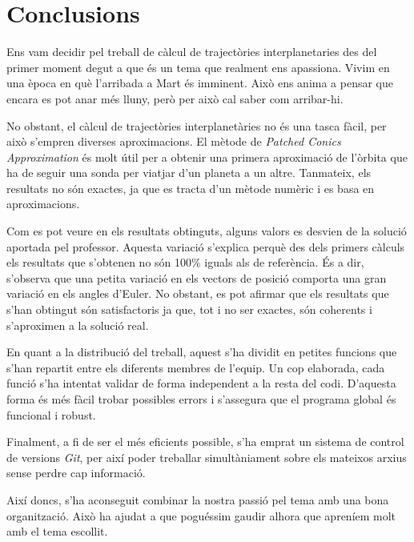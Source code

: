 \chapter{Conclusions}
Ens vam decidir pel treball de càlcul de trajectòries interplanetaries des del primer moment degut a que és un tema que realment ens apassiona. Vivim en una època en què l'arribada a Mart és imminent. Això ens anima a pensar que encara es pot anar més lluny, però per això cal saber com arribar-hi.

No obstant, el càlcul de trajectòries interplanetàries no és una tasca fàcil, per això s'empren diverses aproximacions. El mètode de \textit{Patched Conics Approximation} és  molt útil per a obtenir una primera aproximació de l'òrbita que ha de seguir una sonda per viatjar d'un planeta a un altre. Tanmateix, els resultats no són exactes, ja que es tracta d'un mètode numèric i es basa en aproximacions.

Com es pot veure en els resultats obtinguts, alguns valors es desvien de la solució aportada pel professor. Aquesta variació s'explica perquè des dels primers càlculs els resultats que s'obtenen no són 100\% iguals als de referència. És a dir, s'observa que una petita variació en els vectors de posició comporta una gran variació en els angles d'Euler. No obstant, es pot afirmar que els resultats que s'han obtingut són satisfactoris ja que, tot i no ser exactes, són coherents i s'aproximen a la solució real.

En quant a la distribució del treball, aquest s'ha dividit en petites funcions que s'han repartit entre els diferents membres de l'equip. Un cop elaborada, cada funció s'ha intentat validar de forma independent a la resta del codi. D'aquesta forma és més fàcil trobar possibles errors i s'assegura que el programa global és funcional i robust.

Finalment, a fi de ser el més eficients possible, s'ha emprat un sistema de control de versions \textit{Git}, per així poder treballar simultàniament sobre els mateixos arxius sense perdre cap informació.

Així doncs, s'ha aconseguit combinar la nostra passió pel tema amb una bona organització. Això ha ajudat a que poguéssim gaudir alhora que apreníem molt amb el tema escollit.
